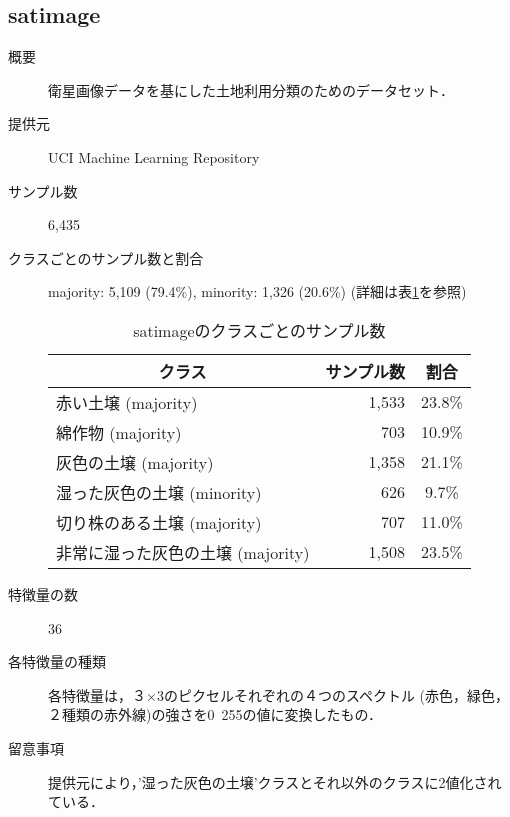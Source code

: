     \subsection{satimage}
    \begin{description}
        \item[概要] 衛星画像データを基にした土地利用分類のためのデータセット．\cite{satimage}
        \item[提供元] UCI Machine Learning Repository
        \item[サンプル数] 6,435
        \item[クラスごとのサンプル数と割合] majority: 5,109 (79.4\%), minority: 1,326 (20.6\%) (詳細は表\ref{tab:satimage}を参照)
            
            \begin{table}[htbp]
                \centering
                \caption{satimageのクラスごとのサンプル数}
                \label{tab:satimage}
                \begin{tabular}{lrc} \hline
                    \multicolumn{1}{c}{クラス}&
                    \multicolumn{1}{c}{サンプル数}&
                    \multicolumn{1}{c}{割合}\\
                    \hline
                    \hline
                    赤い土壌 (majority)& 1,533 & 23.8\% \\
                    綿作物 (majority)& 703 & 10.9\% \\
                    灰色の土壌 (majority)& 1,358 & 21.1\% \\
                    湿った灰色の土壌 (minority)& 626 & 9.7\% \\
                    切り株のある土壌 (majority)& 707 & 11.0\% \\
                    非常に湿った灰色の土壌 (majority)& 1,508 & 23.5\% \\
                    \hline
                \end{tabular}
            \end{table}
        \item[特徴量の数] 36
        \item[各特徴量の種類] \mbox{}
            各特徴量は，３$\times$3のピクセルそれぞれの４つのスペクトル (赤色，緑色，２種類の赤外線)の強さを0~255の値に変換したもの．
        \item[留意事項]  提供元により，'湿った灰色の土壌'クラスとそれ以外のクラスに2値化されている．
    \end{description}

